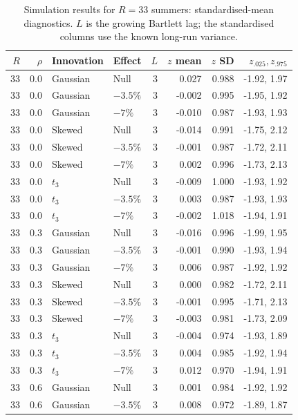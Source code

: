 \begin{table}[H]
\centering
\normalsize\renewcommand{\arraystretch}{1.55}\setlength{\tabcolsep}{4pt}
\caption{Simulation results for $R=33$ summers: standardised-mean diagnostics. $L$ is the growing Bartlett lag; the standardised columns use the known long-run variance.}
\label{tab:year-simulation-complete-b-r33}
\begin{tabular*}{\textwidth}{@{\extracolsep{\fill}}rrllrrrr}
\toprule
$R$ & $\rho$ & Innovation & Effect & $L$ & $z$ mean & $z$ SD & $z_{.025},z_{.975}$ \\
\midrule
33 & 0.0 & Gaussian & Null & 3 & 0.027 & 0.988 & -1.92, 1.97 \\
33 & 0.0 & Gaussian & $-3.5\%$ & 3 & -0.002 & 0.995 & -1.95, 1.92 \\
33 & 0.0 & Gaussian & $-7\%$ & 3 & -0.010 & 0.987 & -1.93, 1.93 \\
33 & 0.0 & Skewed & Null & 3 & -0.014 & 0.991 & -1.75, 2.12 \\
33 & 0.0 & Skewed & $-3.5\%$ & 3 & -0.001 & 0.987 & -1.72, 2.11 \\
33 & 0.0 & Skewed & $-7\%$ & 3 & 0.002 & 0.996 & -1.73, 2.13 \\
33 & 0.0 & $t_3$ & Null & 3 & -0.009 & 1.000 & -1.93, 1.92 \\
33 & 0.0 & $t_3$ & $-3.5\%$ & 3 & 0.003 & 0.987 & -1.93, 1.93 \\
33 & 0.0 & $t_3$ & $-7\%$ & 3 & -0.002 & 1.018 & -1.94, 1.91 \\
33 & 0.3 & Gaussian & Null & 3 & -0.016 & 0.996 & -1.99, 1.95 \\
33 & 0.3 & Gaussian & $-3.5\%$ & 3 & -0.001 & 0.990 & -1.93, 1.94 \\
33 & 0.3 & Gaussian & $-7\%$ & 3 & 0.006 & 0.987 & -1.92, 1.92 \\
33 & 0.3 & Skewed & Null & 3 & 0.000 & 0.982 & -1.72, 2.11 \\
33 & 0.3 & Skewed & $-3.5\%$ & 3 & -0.001 & 0.995 & -1.71, 2.13 \\
33 & 0.3 & Skewed & $-7\%$ & 3 & -0.003 & 0.981 & -1.73, 2.09 \\
33 & 0.3 & $t_3$ & Null & 3 & -0.004 & 0.974 & -1.93, 1.89 \\
33 & 0.3 & $t_3$ & $-3.5\%$ & 3 & 0.004 & 0.985 & -1.92, 1.94 \\
33 & 0.3 & $t_3$ & $-7\%$ & 3 & 0.012 & 0.970 & -1.94, 1.91 \\
33 & 0.6 & Gaussian & Null & 3 & 0.001 & 0.984 & -1.92, 1.92 \\
33 & 0.6 & Gaussian & $-3.5\%$ & 3 & 0.008 & 0.972 & -1.89, 1.87 \\

\end{tabular*}
\end{table}
